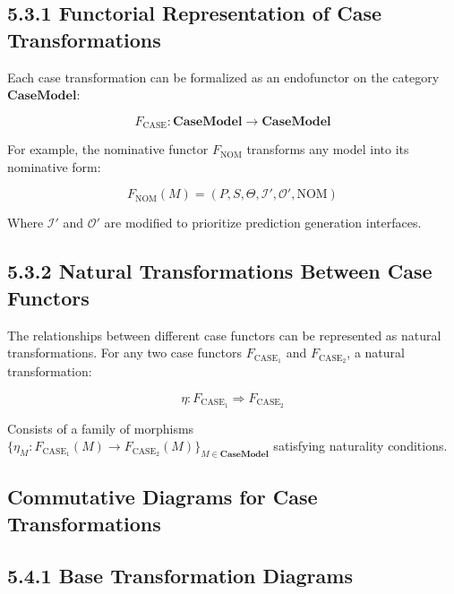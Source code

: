 \documentclass[
  11pt,
  letterpaper,
]{article}
\begin{document}
\hypertarget{functorial-representation-of-case-transformations}{%
\subsection{5.3.1 Functorial Representation of Case
Transformations}\label{functorial-representation-of-case-transformations}}

Each case transformation can be formalized as an endofunctor on the
category \(\mathbf{CaseModel}\):

\[F_{\text{CASE}}: \mathbf{CaseModel} \rightarrow \mathbf{CaseModel}\]

For example, the nominative functor \(F_{\text{NOM}}\) transforms any
model into its nominative form:

\[F_{\text{NOM}}(M) = (P, S, \Theta, \mathcal{I}', \mathcal{O}', \text{NOM})\]

Where \(\mathcal{I}'\) and \(\mathcal{O}'\) are modified to prioritize
prediction generation interfaces.

\hypertarget{natural-transformations-between-case-functors}{%
\subsection{5.3.2 Natural Transformations Between Case
Functors}\label{natural-transformations-between-case-functors}}

The relationships between different case functors can be represented as
natural transformations. For any two case functors \(F_{\text{CASE}_1}\)
and \(F_{\text{CASE}_2}\), a natural transformation:

\[\eta: F_{\text{CASE}_1} \Rightarrow F_{\text{CASE}_2}\]

Consists of a family of morphisms
\(\{\eta_M: F_{\text{CASE}_1}(M) \rightarrow F_{\text{CASE}_2}(M)\}_{M \in \mathbf{CaseModel}}\)
satisfying naturality conditions.

\hypertarget{commutative-diagrams-for-case-transformations}{%
\subsection{Commutative Diagrams for Case
Transformations}\label{commutative-diagrams-for-case-transformations}}

\hypertarget{base-transformation-diagrams}{%
\subsection{5.4.1 Base Transformation
Diagrams}\label{base-transformation-diagrams}}
\end{document}
